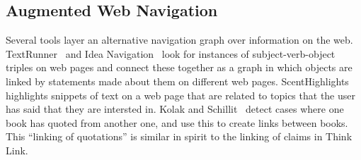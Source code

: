 \documentclass{chi2009}
\begin{document}
\subsection{Augmented Web Navigation}

Several tools layer an alternative navigation graph over information on the web. TextRunner~\cite{Etzioni2008} and Idea Navigation~\cite{Etzioni2008} look for instances of subject-verb-object triples on web pages and connect these together as a graph in which objects are linked by statements made about them on different web pages. ScentHighlights~\cite{Chi2005a} highlights snippets of text on a web page that are related to topics that the user has said that they are intersted in. Kolak and Schillit~\cite{Kolak2008} detect cases where one book has quoted from another one, and use this to create links between books. This ``linking of quotations'' is similar in spirit to the linking of claims in Think Link. 

% 
% 

% 

% 

% 

%
\end{document}
